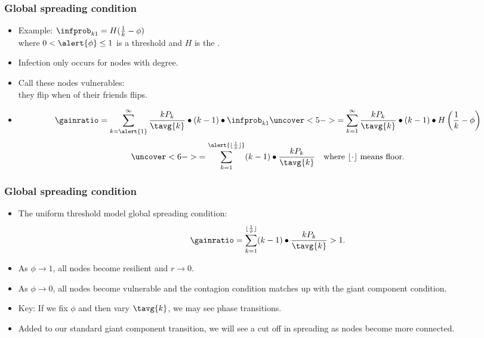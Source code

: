 \begin{frame}
  \frametitle{Global spreading condition}

  \begin{itemize}
  \item<1-> 
    \alert{Example:} $\infprob_{k1}=H(\frac{1}{k}-\phi)$\\
    where $0<\alert{\phi} \le 1$ is a \alert{threshold}
    and $H$ is the .
  \item<2-> 
    Infection only occurs for nodes with  degree.
  \item<3-> 
    Call these nodes \alert{vulnerables}:\\ 
    they flip
    when  of their friends flips.
  \item<4-> 
    $$
    \gainratio
    =
    \sum_{k=\alert{1}}^{\infty}
    \frac{kP_k}{\tavg{k}}
    \bullet
    (k-1)
    \bullet
    \infprob_{k1}
    \uncover<5->{
      =
      \sum_{k=1}^{\infty}
      \frac{kP_k}{\tavg{k}}
      \bullet
      (k-1)
      \bullet
      H\left(
        \frac{1}{k}-\phi
      \right)
    }
    $$
    $$
    \uncover<6->{
      =
      \sum_{k=1}^{\alert{\lfloor \frac{1}{\phi} \rfloor}}
      (k-1)
      \bullet
      \frac{kP_k}{\tavg{k}}
    \mbox{\quad where $\lfloor \cdot \rfloor$ means floor.}
    }
    $$
  \end{itemize}
\end{frame}

\begin{frame}
  \frametitle{Global spreading condition}

  \begin{itemize}
  \item<1->
    The uniform threshold model global spreading condition:
    $$
    \gainratio
    =
    \sum_{k=1}^{{\lfloor \frac{1}{\phi} \rfloor}}
    (k-1)
    \bullet
    \frac{kP_k}
    {\tavg{k}} 
    > 1.
    $$
  \item<2-> 
    As \alert{$\phi \rightarrow 1$}, all nodes become resilient and $r \rightarrow 0$.
  \item<3-> 
    As \alert{$\phi \rightarrow 0$}, all nodes become vulnerable and the contagion
    condition matches up with the giant component condition.
  \item<4->
    \alert{Key}: If we fix $\phi$ and then vary $\tavg{k}$, we
    may see  phase transitions.
  \item<5-> Added to our standard giant component transition,
    we will see a cut off in spreading as nodes become more connected.
  \end{itemize}

\end{frame}

